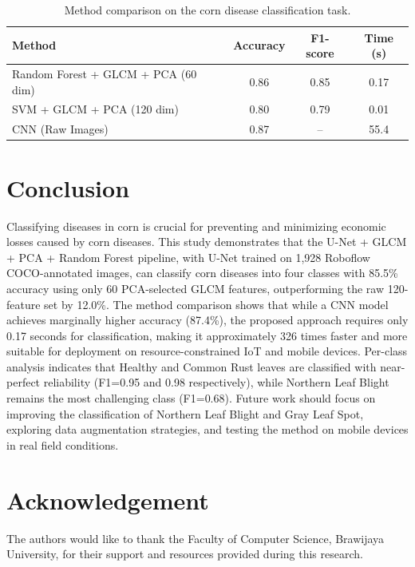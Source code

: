 \documentclass[10pt,a4paper]{article}
\begin{document}
\begin{table}[ht]
    \centering
    \caption{Method comparison on the corn disease classification task.}
    \begin{tabular}{@{}lccc@{}}
        \toprule
        \textbf{Method} & \textbf{Accuracy} & \textbf{F1-score} & \textbf{Time (s)} \\
        \midrule
        Random Forest + GLCM + PCA (60 dim) & 0.86 & 0.85 & 0.17 \\
        SVM + GLCM + PCA (120 dim)          & 0.80 & 0.79 & 0.01 \\
        CNN (Raw Images)                    & 0.87 & --   & 55.4 \\
        \bottomrule
    \end{tabular}
    \label{table:3}
\end{table}

\section{Conclusion}

Classifying diseases in corn is crucial for preventing and minimizing economic losses caused by corn diseases. This study demonstrates that the U-Net + GLCM + PCA + Random Forest pipeline, with U-Net trained on 1,928 Roboflow COCO-annotated images, can classify corn diseases into four classes with 85.5\% accuracy using only 60 PCA-selected GLCM features, outperforming the raw 120-feature set by 12.0\%. The method comparison shows that while a CNN model achieves marginally higher accuracy (87.4\%), the proposed approach requires only 0.17 seconds for classification, making it approximately 326 times faster and more suitable for deployment on resource-constrained IoT and mobile devices. Per-class analysis indicates that Healthy and Common Rust leaves are classified with near-perfect reliability (F1=0.95 and 0.98 respectively), while Northern Leaf Blight remains the most challenging class (F1=0.68). Future work should focus on improving the classification of Northern Leaf Blight and Gray Leaf Spot, exploring data augmentation strategies, and testing the method on mobile devices in real field conditions.

\section{Acknowledgement}

The authors would like to thank the Faculty of Computer Science, Brawijaya University, for their support and resources provided during this research.



\end{document}
